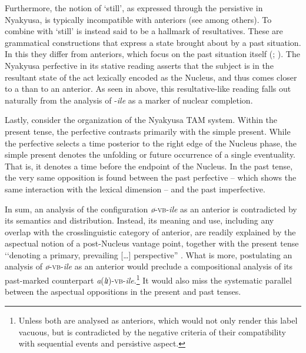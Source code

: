 Furthermore, the notion of \lq still', as expressed through the persistive in Nyakyusa, is typically incompatible with anteriors (see \citealt{NedjalkovPJaxontovS1988} among others). To combine with `still' is instead said to be a hallmark of resultatives. These are grammatical constructions that express a state brought about by a past situation. In this they differ from anteriors, which focus on the past situation itself (\citealt[134]{DahlOe1985}; \citealt[69]{BybeePerkinsPaglucia1994}). The Nyakyusa perfective in its stative reading asserts that the subject is in the resultant state of the act lexically encoded as the Nucleus, and thus comes closer to a  than to an anterior. As seen in  above, this resultative-like reading falls out naturally from the analysis of \mbox{-\textit{ile}} as a marker of nuclear completion.

Lastly, consider the organization of the Nyakyusa TAM system. Within the present tense, the perfective contrasts primarily with the simple present. While the perfective selects a time posterior to the right edge of the Nucleus phase, the simple present denotes the unfolding or future occurrence of a single eventuality. That is, it denotes a time before the endpoint of the Nucleus. In the past tense, the very same opposition is found between the past perfective -- which shows the same interaction with the lexical dimension -- and the past imperfective.

In sum, an analysis of the configuration \textit{ø}-\textsc{vb}-\textit{ile} as an anterior is contradicted by its semantics and distribution. Instead, its meaning and use, including any overlap with the crosslinguistic category of anterior, are readily explained by the aspectual notion of a post-Nucleus vantage point, together with the present tense \lq\lq denoting a primary, prevailing [\ldots] perspective'' \citep[153]{BotneRKershnerT2008}. What is more, postulating an analysis of \textit{ø}-\textsc{vb}-\textit{ile} as an anterior would preclude a compositional analysis of its past-marked counterpart \mbox{\textit{a}(\textit{lɪ})-}\textsc{vb}-\mbox{\textit{ile}}.\footnote{Unless both are analysed as anteriors, which would not only render this label vacuous, but is contradicted by the negative criteria of their compatibility with sequential events and persistive aspect.} It would also miss the systematic parallel between the aspectual oppositions in the present and past tenses.

